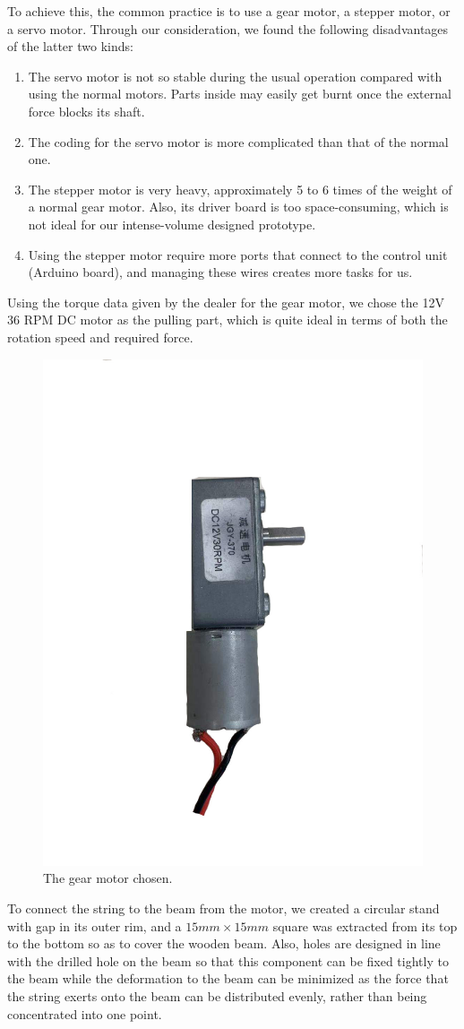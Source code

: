 \documentclass{article}
\begin{document}
To achieve this, the common practice is to use a gear motor, a stepper motor, or a servo motor. Through our consideration, we found the following disadvantages of the latter two kinds:
\begin{enumerate}
\item The servo motor is not so stable during the usual operation compared with using the normal motors. Parts inside may easily get burnt once the external force blocks its shaft.
\item The coding for the servo motor is more complicated than that of the normal one.
\item The stepper motor is very heavy, approximately 5 to 6 times of the weight of a normal gear motor. Also, its driver board is too space-consuming, which is not ideal for our intense-volume designed prototype.
\item Using the stepper motor require more ports that connect to the control unit (Arduino board), and managing these wires creates more tasks for us.
\end{enumerate}
\par Using the torque data given by the dealer for the gear motor, we chose the 12V 36 RPM DC motor as the pulling part, which is quite ideal in terms of both the rotation speed and required force.

\begin{figure}[H]
\centering
\includegraphics[width=0.35\linewidth]{1}
\caption{The gear motor chosen.}
\end{figure}

\par To connect the string to the beam from the motor, we created a circular stand with gap in its outer rim, and a $15mm\times 15mm$ square was extracted from its top to the bottom so as to cover the wooden beam. Also, holes are designed in line with the drilled hole on the beam so that this component can be fixed tightly to the beam while the deformation to the beam can be minimized as the force that the string exerts onto the beam can be distributed evenly, rather than being concentrated into one point.
\end{document}
